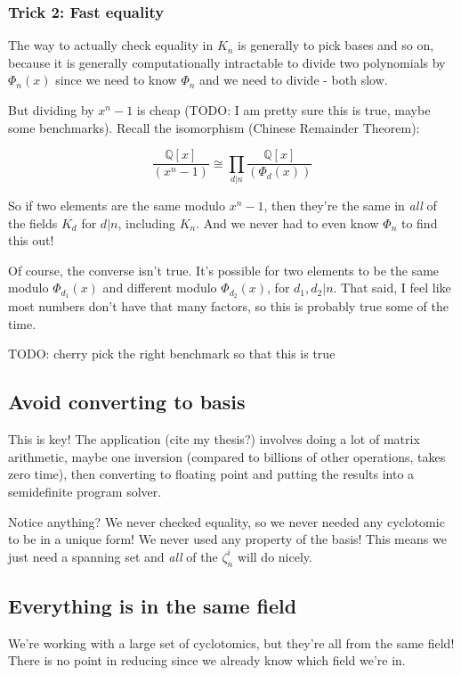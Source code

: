 \documentclass{article}
\begin{document}
\subsubsection{Trick 2: Fast equality}

The way to actually check equality in $K_n$ is generally to pick bases
and so on, because it is generally computationally intractable to
divide two polynomials by $\Phi_n(x)$ since we need to know $\Phi_n$
and we need to divide - both slow.

But dividing by $x^n - 1$ is cheap (TODO: I am pretty sure this is
true, maybe some benchmarks). Recall the isomorphism (Chinese
Remainder Theorem):

$$\frac{\mathbb{Q}[x]}{(x^n-1)} \cong \prod_{d | n}\frac{\mathbb{Q}[x]}{(\Phi_d(x))}$$

So if two elements are the same modulo $x^n-1$, then they're the same
in \emph{all} of the fields $K_d$ for $d | n$, including $K_n$. And we
never had to even know $\Phi_n$ to find this out!

Of course, the converse isn't true. It's possible for two elements to
be the same modulo $\Phi_{d_1}(x)$ and different modulo
$\Phi_{d_2}(x)$, for $d_1, d_2 | n$. That said, I feel like most
numbers don't have that many factors, so this is probably true some of
the time.

TODO: cherry pick the right benchmark so that this is true


\subsection{Avoid converting to basis}

This is key! The application (cite my thesis?) involves doing a lot of
matrix arithmetic, maybe one inversion (compared to billions of other
operations, takes zero time), then converting to floating point and
putting the results into a semidefinite program solver.

Notice anything? We never checked equality, so we never needed any
cyclotomic to be in a unique form! We never used any property of the
basis! This means we just need a spanning set and \emph{all} of the
$\zeta_n^i$ will do nicely.

\subsection{Everything is in the same field}

We're working with a large set of cyclotomics, but they're all from
the same field! There is no point in reducing since we already know
which field we're in.
\end{document}
